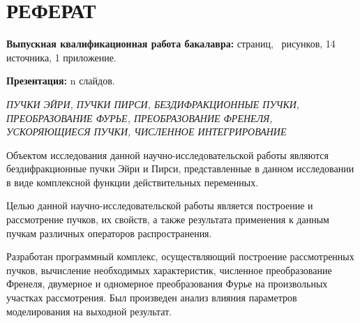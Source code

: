 \section*{РЕФЕРАТ}
{
	\textbf{Выпускная квалификационная работа бакалавра:}
	\pageref{LastPage} страниц,
	\totalfigures\ рисунков,
	14 источника,
	1 приложение.
	
	\textbf{Презентация:} n слайдов.
	
	\textit{ПУЧКИ ЭЙРИ, ПУЧКИ ПИРСИ, БЕЗДИФРАКЦИОННЫЕ ПУЧКИ, ПРЕОБРАЗОВАНИЕ ФУРЬЕ, ПРЕОБРАЗОВАНИЕ ФРЕНЕЛЯ, УСКОРЯЮЩИЕСЯ ПУЧКИ, ЧИСЛЕННОЕ
ИНТЕГРИРОВАНИЕ}

	Объектом исследования данной научно-исследовательской работы
являются бездифракционные пучки Эйри и Пирси, представленные в данном
исследовании в виде комплексной функции действительных переменных.

Целью данной научно-исследовательской работы является построение и
рассмотрение пучков, их свойств, а также результата применения к данным пучкам различных операторов распространения.

Разработан программный комплекс, осуществляющий построение
рассмотренных пучков, вычисление необходимых характеристик, численное
преобразование Френеля, двумерное и одномерное преобразования Фурье на произвольных участках рассмотрения. Был
произведен анализ влияния параметров моделирования на выходной результат.


}
\newpage

\newpage
\tableofcontents
\newpage


